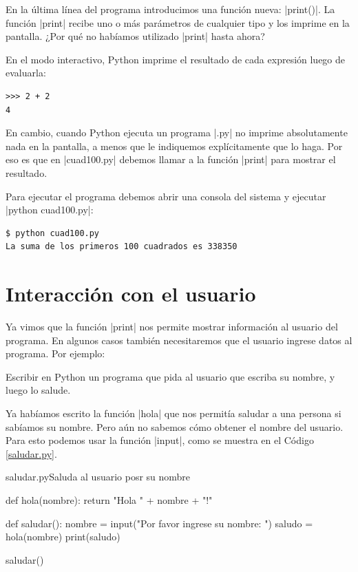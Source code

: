 En la última línea del programa introducimos una función nueva: |print()|.
La función |print| recibe uno o más parámetros de cualquier tipo y los imprime
en la pantalla. ¿Por qué no habíamos utilizado |print| hasta ahora?

En el modo interactivo, Python imprime el resultado de cada expresión luego de
evaluarla:

\begin{lstlisting}[numbers=none]
>>> 2 + 2
4
\end{lstlisting}

En cambio, cuando Python ejecuta un programa |.py| no imprime absolutamente
nada en la pantalla, a menos que le indiquemos explícitamente que lo haga. Por
eso es que en |cuad100.py| debemos llamar a la función |print| para mostrar el
resultado.

Para ejecutar el programa debemos abrir una consola del sistema y ejecutar
|python cuad100.py|:

\begin{lstlisting}[numbers=none]
$ python cuad100.py
La suma de los primeros 100 cuadrados es 338350
\end{lstlisting}

\section{Interacción con el usuario}

Ya vimos que la función |print| nos permite mostrar información al usuario del
programa. En algunos casos también necesitaremos que el usuario ingrese datos
al programa. Por ejemplo:

\begin{problema}
Escribir en Python un programa que pida al usuario que escriba su nombre, y
luego lo salude.

\begin{solucion}
Ya habíamos escrito la función |hola| que nos permitía saludar a una
persona si sabíamos su nombre. Pero aún no sabemos cómo obtener el nombre del
usuario. Para esto podemos usar la función |input|, como se muestra en el
Código \ref{saludar.py}.

\begin{codigo}{saludar.py}{Saluda al usuario posr su nombre}
\label{saludar.py}
\begin{codigo-python}
def hola(nombre):
    return "Hola " + nombre + "!"

def saludar():
    nombre = input("Por favor ingrese su nombre: ")
    saludo = hola(nombre)
    print(saludo)

saludar()
\end{codigo-python}
\end{codigo}
\end{solucion}
\end{problema}


